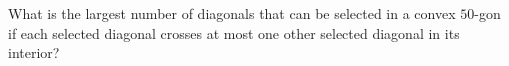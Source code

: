 What is the largest number of diagonals that can be selected in a convex $50$-gon if each selected diagonal crosses at most one other selected diagonal in its interior?
